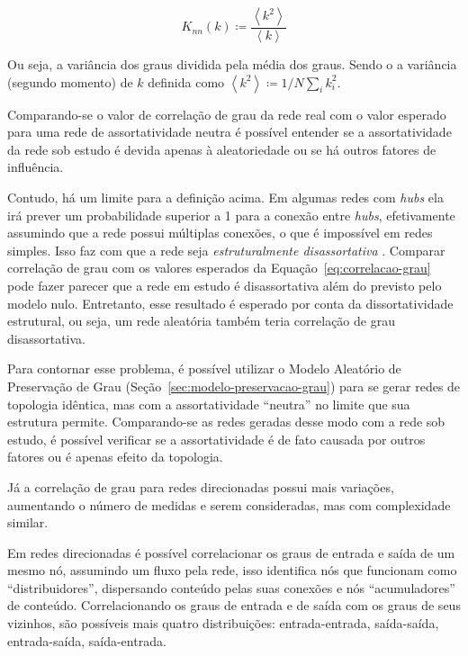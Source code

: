 \documentclass[12pt,a4paper,final]{article}
\newcommand{\avg}[1]{\left\langle #1 \right\rangle} %
\newcommand{\defn}{\coloneqq} %
\begin{document}
\begin{equation} \label{eq:correlacao-grau}
K_\textit{nn}(k) \defn \frac{\avg{k^2}}{\avg{k}}
\end{equation}

Ou seja, a variância dos graus dividida pela média dos graus. Sendo o a variância (segundo momento) de $k$ definida como $\avg{k^2} \defn 1/N \sum_i k_i^2$.

Comparando-se o valor de correlação de grau da rede real com o valor esperado para uma rede de assortatividade neutra é possível entender se a assortatividade da rede sob estudo é devida apenas à aleatoriedade ou se há outros fatores de influência.

Contudo, há um limite para a definição acima. Em algumas redes com \textit{hubs} ela irá prever um probabilidade superior a 1 para a conexão entre \textit{hubs}, efetivamente assumindo que a rede possui múltiplas conexões, o que é impossível em redes simples. Isso faz com que a rede seja \textit{estruturalmente disassortativa} \cite{Barabasi2016-rn}. Comparar correlação de grau com os valores esperados da Equação~\ref{eq:correlacao-grau} pode fazer parecer que a rede em estudo é disassortativa além do previsto pelo modelo nulo. Entretanto, esse resultado é esperado por conta da dissortatividade estrutural, ou seja, um rede aleatória também teria correlação de grau disassortativa.

Para contornar esse problema, é possível utilizar o Modelo Aleatório de Preservação de Grau (Seção~\ref{sec:modelo-preservacao-grau}) para se gerar redes de topologia idêntica, mas com a assortatividade \enquote{neutra} no limite que sua estrutura permite. Comparando-se as redes geradas desse modo com a rede sob estudo, é possível verificar se a assortatividade é de fato causada por outros fatores ou é apenas efeito da topologia.

Já a correlação de grau para redes direcionadas possui mais variações, aumentando o número de medidas e serem consideradas, mas com complexidade similar.

Em redes direcionadas é possível correlacionar os graus de entrada e saída de um mesmo nó, assumindo um fluxo pela rede, isso identifica nós que funcionam como \enquote{distribuidores}, dispersando conteúdo pelas suas conexões e nós \enquote{acumuladores} de conteúdo. Correlacionando os graus de entrada e de saída com  os graus de seus vizinhos, são possíveis mais quatro distribuições: entrada-entrada, saída-saída, entrada-saída, saída-entrada.
\end{document}
